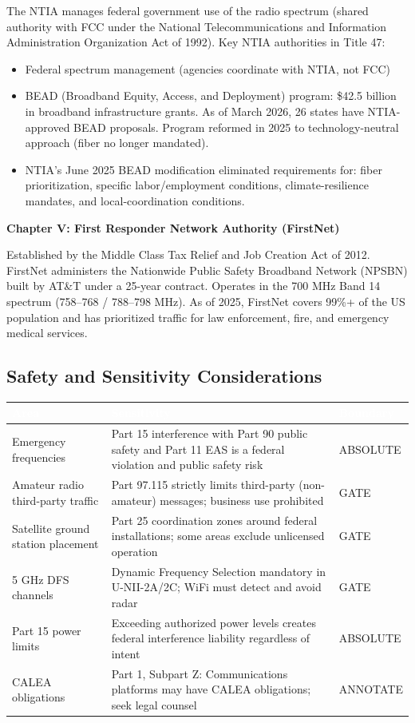 \documentclass[11pt,letterpaper]{article}
\newcommand{\tableheader}[1]{\textbf{\sffamily\textcolor{white}{#1}}}
\begin{document}
The NTIA manages federal government use of the radio spectrum (shared authority with FCC under the National Telecommunications and Information Administration Organization Act of 1992). Key NTIA authorities in Title 47:
\begin{itemize}[leftmargin=1.5em]
  \item Federal spectrum management (agencies coordinate with NTIA, not FCC)
  \item BEAD (Broadband Equity, Access, and Deployment) program: \$42.5 billion in broadband infrastructure grants. As of March 2026, 26 states have NTIA-approved BEAD proposals. Program reformed in 2025 to technology-neutral approach (fiber no longer mandated).
  \item NTIA's June 2025 BEAD modification eliminated requirements for: fiber prioritization, specific labor/employment conditions, climate-resilience mandates, and local-coordination conditions.
\end{itemize}

\textbf{Chapter V: First Responder Network Authority (FirstNet)}

Established by the Middle Class Tax Relief and Job Creation Act of 2012. FirstNet administers the Nationwide Public Safety Broadband Network (NPSBN) built by AT\&T under a 25-year contract. Operates in the 700 MHz Band 14 spectrum (758--768 / 788--798 MHz). As of 2025, FirstNet covers 99\%+ of the US population and has prioritized traffic for law enforcement, fire, and emergency medical services.

\subsection{Safety and Sensitivity Considerations}

\begin{center}
\begin{tabularx}{\textwidth}{L{3.5cm}XC{2cm}}
\toprule
{}
\tableheader{Area} & \tableheader{Sensitivity} & \tableheader{Boundary} \\
\midrule
Emergency frequencies & Part 15 interference with Part 90 public safety and Part 11 EAS is a federal violation and public safety risk & ABSOLUTE \\
Amateur radio third-party traffic & Part 97.115 strictly limits third-party (non-amateur) messages; business use prohibited & GATE \\
Satellite ground station placement & Part 25 coordination zones around federal installations; some areas exclude unlicensed operation & GATE \\
5 GHz DFS channels & Dynamic Frequency Selection mandatory in U-NII-2A/2C; WiFi must detect and avoid radar & GATE \\
Part 15 power limits & Exceeding authorized power levels creates federal interference liability regardless of intent & ABSOLUTE \\
CALEA obligations & Part 1, Subpart Z: Communications platforms may have CALEA obligations; seek legal counsel & ANNOTATE \\
\bottomrule
\end{tabularx}
\end{center}
\end{document}
